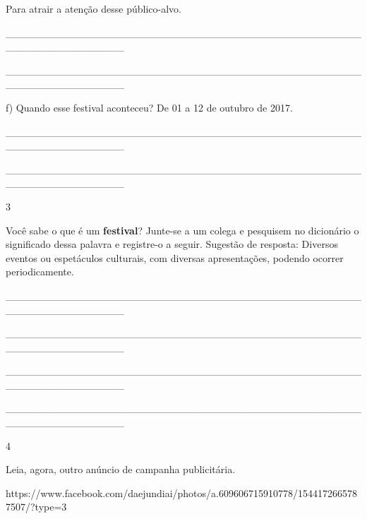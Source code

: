 \begin{itemize}
{{{\begin{itemize}
\begin{itemize}
Para atrair a atenção desse público-alvo.

\protect\hypertarget{_Hlk129075109}{}{}\_\_\_\_\_\_\_\_\_\_\_\_\_\_\_\_\_\_\_\_\_\_\_\_\_\_\_\_\_\_\_\_\_\_\_\_\_\_\_\_\_\_\_\_\_\_\_\_\_\_\_\_\_\_\_\_\_\_\_\_\_\_\_\_

\_\_\_\_\_\_\_\_\_\_\_\_\_\_\_\_\_\_\_\_\_\_\_\_\_\_\_\_\_\_\_\_\_\_\_\_\_\_\_\_\_\_\_\_\_\_\_\_\_\_\_\_\_\_\_\_\_\_\_\_\_\_\_\_

f) Quando esse festival aconteceu? De 01 a 12 de outubro de 2017.

\_\_\_\_\_\_\_\_\_\_\_\_\_\_\_\_\_\_\_\_\_\_\_\_\_\_\_\_\_\_\_\_\_\_\_\_\_\_\_\_\_\_\_\_\_\_\_\_\_\_\_\_\_\_\_\_\_\_\_\_\_\_\_\_

\_\_\_\_\_\_\_\_\_\_\_\_\_\_\_\_\_\_\_\_\_\_\_\_\_\_\_\_\_\_\_\_\_\_\_\_\_\_\_\_\_\_\_\_\_\_\_\_\_\_\_\_\_\_\_\_\_\_\_\_\_\_\_\_

\num{3}

Você sabe o que é um \textbf{festival}? Junte-se a um colega e pesquisem
no dicionário o significado dessa palavra e registre-o a seguir.
Sugestão de resposta: Diversos eventos ou espetáculos culturais, com
diversas apresentações, podendo ocorrer periodicamente.

\_\_\_\_\_\_\_\_\_\_\_\_\_\_\_\_\_\_\_\_\_\_\_\_\_\_\_\_\_\_\_\_\_\_\_\_\_\_\_\_\_\_\_\_\_\_\_\_\_\_\_\_\_\_\_\_\_\_\_\_\_\_\_\_

\_\_\_\_\_\_\_\_\_\_\_\_\_\_\_\_\_\_\_\_\_\_\_\_\_\_\_\_\_\_\_\_\_\_\_\_\_\_\_\_\_\_\_\_\_\_\_\_\_\_\_\_\_\_\_\_\_\_\_\_\_\_\_\_

\_\_\_\_\_\_\_\_\_\_\_\_\_\_\_\_\_\_\_\_\_\_\_\_\_\_\_\_\_\_\_\_\_\_\_\_\_\_\_\_\_\_\_\_\_\_\_\_\_\_\_\_\_\_\_\_\_\_\_\_\_\_\_\_

\_\_\_\_\_\_\_\_\_\_\_\_\_\_\_\_\_\_\_\_\_\_\_\_\_\_\_\_\_\_\_\_\_\_\_\_\_\_\_\_\_\_\_\_\_\_\_\_\_\_\_\_\_\_\_\_\_\_\_\_\_\_\_\_

\num{4}

Leia, agora, outro anúncio de campanha publicitária.

https://www.facebook.com/daejundiai/photos/a.609606715910778/1544172665787507/?type=3


\end{itemize}
\end{itemize}}}}
\end{itemize}

